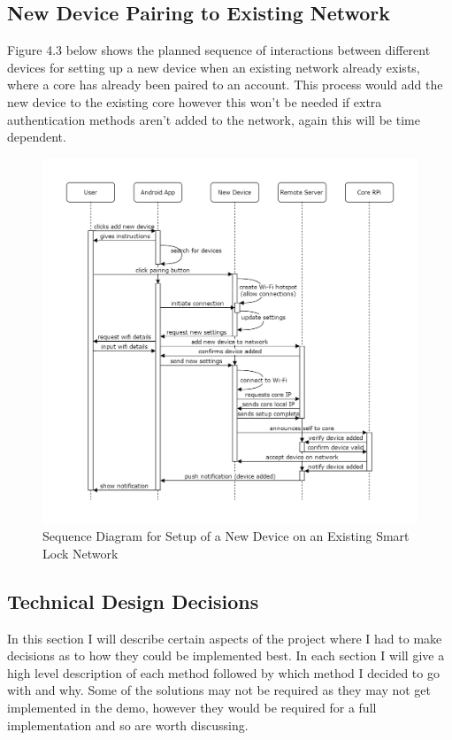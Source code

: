 \subsection{New Device Pairing to Existing Network}
Figure 4.3 below shows the planned sequence of interactions between different devices for setting up a new device when an existing network already exists, where a core has already been paired to an account. This process would add the new device to the existing core however this won't be needed if extra authentication methods aren't added to the network, again this will be time dependent.
\begin{figure}[H]
	\caption{Sequence Diagram for Setup of a New Device on an Existing Smart Lock Network}
	\centering
		\includegraphics[height=0.6\textheight,keepaspectratio]{"Graphics/New Device Pairing to Network"}
\end{figure}

\subsection{Technical Design Decisions}
In this section I will describe certain aspects of the project where I had to make decisions as to how they could be implemented best. In each section I will give a high level description of each method followed by which method I decided to go with and why. Some of the solutions may not be required as they may not get implemented in the demo, however they would be required for a full implementation and so are worth discussing.

